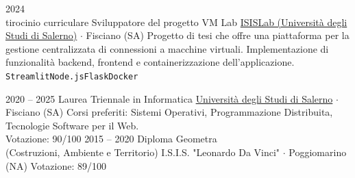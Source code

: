 \documentclass[10pt]{developercv} %
\begin{document}

\begin{entrylist}
	\entry
		{2024\\\footnotesize{tirocinio curriculare}}
		{Sviluppatore del progetto VM Lab}
		{\href{https://github.com/isislab-unisa}{ISISLab (Università degli Studi di Salerno)} $\cdot$ Fisciano (SA)}
		{Progetto di tesi che offre una piattaforma per la gestione centralizzata di connessioni a macchine virtuali. Implementazione di funzionalità backend, frontend e containerizzazione dell'applicazione.\\
		\texttt{Streamlit}\slashsep\texttt{Node.js}\slashsep\texttt{Flask}\slashsep\texttt{Docker}}
\end{entrylist}

%



\begin{entrylist}
	\entry
		{2020 -- 2025}
		{Laurea Triennale in Informatica}
		{\href{https://www.unisa.it/}{Università degli Studi di Salerno} $\cdot$ Fisciano (SA)}
		{Corsi preferiti: Sistemi Operativi, Programmazione Distribuita, Tecnologie Software per il Web. \\ Votazione: 90/100}
	\entry
		{2015 -- 2020}
		{Diploma Geometra \\ (Costruzioni, Ambiente e Territorio)}
		{I.S.I.S. "Leonardo Da Vinci" $\cdot$ Poggiomarino (NA)}
		{Votazione: 89/100}
\end{entrylist}
\end{document}
